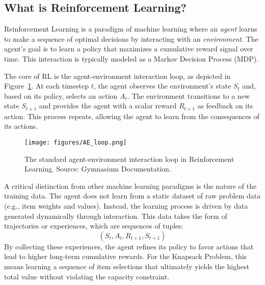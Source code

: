 \subsection{What is Reinforcement Learning?}

Reinforcement Learning is a paradigm of machine learning where an \textit{agent} learns to make a sequence of optimal decisions by interacting with an \textit{environment}. The agent's goal is to learn a policy that maximizes a cumulative reward signal over time. This interaction is typically modeled as a Markov Decision Process (MDP).

The core of RL is the agent-environment interaction loop, as depicted in Figure~\ref{fig:ae_loop}. At each timestep \(t\), the agent observes the environment's state \(S_t\) and, based on its policy, selects an action \(A_t\). The environment transitions to a new state \(S_{t+1}\) and provides the agent with a scalar reward \(R_{t+1}\) as feedback on its action. This process repeats, allowing the agent to learn from the consequences of its actions.

\begin{figure}[htbp]
    \centering
    \texttt{[image: figures/AE\_loop.png]}
    \caption{The standard agent-environment interaction loop in Reinforcement Learning. Source: Gymnasium Documentation.}
    \label{fig:ae_loop}
\end{figure}

A critical distinction from other machine learning paradigms is the nature of the training data. The agent does not learn from a static dataset of raw problem data (e.g., item weights and values). Instead, the learning process is driven by data generated dynamically through interaction. This data takes the form of trajectories or experiences, which are sequences of tuples:
\[ (S_t, A_t, R_{t+1}, S_{t+1}) \]
By collecting these experiences, the agent refines its policy to favor actions that lead to higher long-term cumulative rewards. For the Knapsack Problem, this means learning a sequence of item selections that ultimately yields the highest total value without violating the capacity constraint.